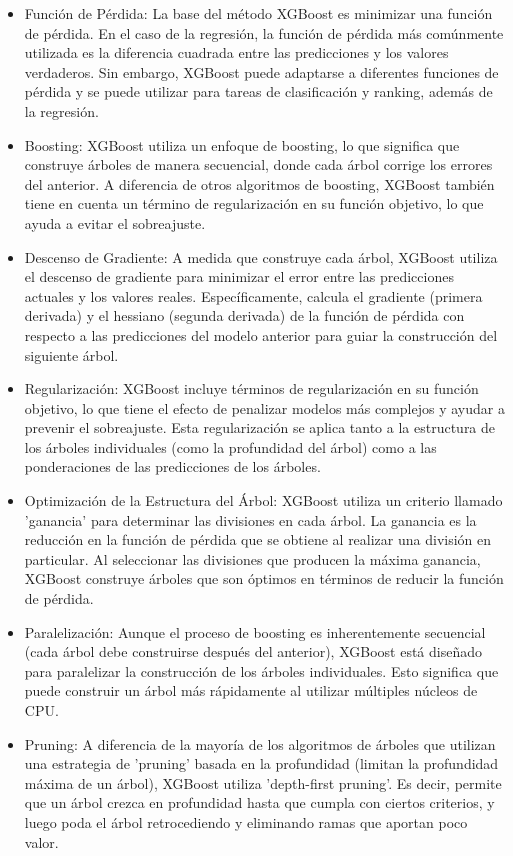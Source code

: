 \documentclass[12pt]{article}
\begin{document}
\begin{itemize}
  \item Función de Pérdida: La base del método XGBoost es minimizar una función de pérdida. En el caso de la regresión, la función de pérdida más comúnmente utilizada es la diferencia cuadrada entre las predicciones y los valores verdaderos. Sin embargo, XGBoost puede adaptarse a diferentes funciones de pérdida y se puede utilizar para tareas de clasificación y ranking, además de la regresión.
  \item Boosting: XGBoost utiliza un enfoque de boosting, lo que significa que construye árboles de manera secuencial, donde cada árbol corrige los errores del anterior. A diferencia de otros algoritmos de boosting, XGBoost también tiene en cuenta un término de regularización en su función objetivo, lo que ayuda a evitar el sobreajuste.
  \item Descenso de Gradiente: A medida que construye cada árbol, XGBoost utiliza el descenso de gradiente para minimizar el error entre las predicciones actuales y los valores reales. Específicamente, calcula el gradiente (primera derivada) y el hessiano (segunda derivada) de la función de pérdida con respecto a las predicciones del modelo anterior para guiar la construcción del siguiente árbol.
  \item Regularización: XGBoost incluye términos de regularización en su función objetivo, lo que tiene el efecto de penalizar modelos más complejos y ayudar a prevenir el sobreajuste. Esta regularización se aplica tanto a la estructura de los árboles individuales (como la profundidad del árbol) como a las ponderaciones de las predicciones de los árboles.
  \item Optimización de la Estructura del Árbol: XGBoost utiliza un criterio llamado 'ganancia' para determinar las divisiones en cada árbol. La ganancia es la reducción en la función de pérdida que se obtiene al realizar una división en particular. Al seleccionar las divisiones que producen la máxima ganancia, XGBoost construye árboles que son óptimos en términos de reducir la función de pérdida.
  \item Paralelización: Aunque el proceso de boosting es inherentemente secuencial (cada árbol debe construirse después del anterior), XGBoost está diseñado para paralelizar la construcción de los árboles individuales. Esto significa que puede construir un árbol más rápidamente al utilizar múltiples núcleos de CPU.
  \item Pruning: A diferencia de la mayoría de los algoritmos de árboles que utilizan una estrategia de 'pruning' basada en la profundidad (limitan la profundidad máxima de un árbol), XGBoost utiliza 'depth-first pruning'. Es decir, permite que un árbol crezca en profundidad hasta que cumpla con ciertos criterios, y luego poda el árbol retrocediendo y eliminando ramas que aportan poco valor.
\end{itemize}
\end{document}
